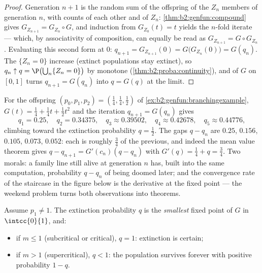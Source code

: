 \begin{proof}
Generation $n + 1$ is the random sum of the offspring of the $Z_n$
members of generation $n$, with counts  of each other
and of $Z_n$: \cref{thm:b2:genfun:compound} gives $G_{Z_{n+1}} =
G_{Z_n} \circ G$, and induction from $G_{Z_0}(t) = t$ yields the
$n$-fold iterate --- which, by associativity of composition, can
equally be read as $G_{Z_{n+1}} = G \circ G_{Z_n}$. Evaluating
this second form at $0$: $q_{n+1} = G_{Z_{n+1}}(0) =
G\bigl(G_{Z_n}(0)\bigr) = G(q_n)$. The  $\{Z_n = 0\}$ increase (extinct populations stay
extinct), so $q_n \uparrow q = \P\bigl(\bigcup_n\{Z_n = 0\}\bigr)$
by monotone  (\cref{thm:b2:proba:continuity}), and
 of $G$ on $[0, 1]$ turns $q_{n+1} = G(q_n)$ into $q =
G(q)$ at the limit.
\end{proof}

\begin{example}
\label{ex:b2:genfun:cobwebnumerics}
For the offspring  $(p_0, p_1, p_2) = (\tfrac14,
\tfrac14, \tfrac12)$ of \cref{ex:b2:genfun:branchingexample},
$G(t) = \tfrac14 + \tfrac14t + \tfrac12t^2$ and the iteration
$q_{n+1} = G(q_n)$ gives
\[
q_1 = 0.25, \quad q_2 = 0.34375, \quad q_3 \approx 0.39502,
\quad q_4 \approx 0.42678, \quad q_5 \approx 0.44776,
\]
climbing toward the extinction probability $q = \tfrac12$.
The gaps $q - q_n$ are $0.25$, $0.156$, $0.105$, $0.073$,
$0.052$: each is roughly $\tfrac34$ of the previous, and
indeed the mean value theorem gives $q - q_{n+1} = G'(c_n)(q
- q_n)$ with $G'(q) = \tfrac14 + q = \tfrac34$. Two morals: a
family line still alive at generation $n$ has, built into
the same computation, probability $q - q_n$ of being doomed
later; and the convergence rate of the staircase in the
figure below is the derivative at the fixed point --- the
weekend problem turns both observations into theorems.
\end{example}

\begin{theorem}\label{thm:b2:genfun:extinction}
Assume $p_1 \neq 1$. The extinction probability $q$ is the
\emph{smallest} fixed point of $G$ in $\intcc{0}{1}$, and:
\begin{itemize}
\item if $m \leq 1$ (subcritical or critical), $q = 1$: extinction
is certain;
\item if $m > 1$ (supercritical), $q < 1$: the population survives
forever with positive probability $1 - q$.
\end{itemize}
\end{theorem}


